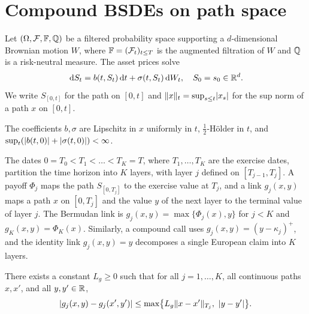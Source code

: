 \section{Compound BSDEs on path space}\label{sec:setting}

Let $(\Omega,\mathcal{F},\mathbb{F},\mathbb{Q})$ be a filtered probability space supporting a $d$-dimensional Brownian motion $W$, where $\mathbb{F}=(\mathcal{F}_t)_{t\le T}$ is the augmented filtration of $W$ and $\mathbb{Q}$ is a risk-neutral measure. The asset prices solve
\begin{equation}\label{eq:sde}
\,\mathrm{d} S_t=b(t,S_t)\,\mathrm{d} t+\sigma(t,S_t)\,\mathrm{d} W_t,\quad S_0=s_0\in\mathbb{R}^d .
\end{equation}
We write $S_{[0,t]}$ for the path on $[0,t]$ and $\lVert x\rVert_t=\sup_{s\le t}\lvert x_s\rvert$ for the sup norm of a path $x$ on $[0,t]$.

\begin{assumption}\label{ass:sde}
The coefficients $b,\sigma$ are Lipschitz in $x$ uniformly in $t$, $\tfrac12$-H\"older in $t$, and $\sup_t(\lvert b(t,0)\rvert+\lvert \sigma(t,0)\rvert)<\infty$.
\end{assumption}

The dates $0=T_0<T_1<\dots<T_K=T$, where $T_1,\dots,T_K$ are the exercise dates, partition the time horizon into $K$ layers, with layer $j$ defined on $[T_{j-1},T_j]$. A payoff $\Phi_j$ maps the path $S_{[0,T_j]}$ to the exercise value at $T_j$, and a link $g_j(x,y)$ maps a path $x$ on $[0,T_j]$ and the value $y$ of the next layer to the terminal value of layer $j$. The Bermudan link is $g_j(x,y)=\max\{\Phi_j(x),y\}$ for $j<K$ and $g_K(x,y)=\Phi_K(x)$. Similarly, a compound call uses $g_j(x,y)=(y-\kappa_j)^+$, and the identity link $g_j(x,y)=y$ decomposes a single European claim into $K$ layers.

\begin{assumption}\label{ass:link}
There exists a constant $L_g\ge0$ such that for all $j=1,\dots,K$, all continuous paths $x,x'$, and all $y,y'\in\mathbb{R}$,
\[
\abs{g_j(x,y)-g_j(x',y')}\le\max\bigl\{L_g\norm{x-x'}_{T_j},\ \abs{y-y'}\bigr\}.
\]
\end{assumption}

